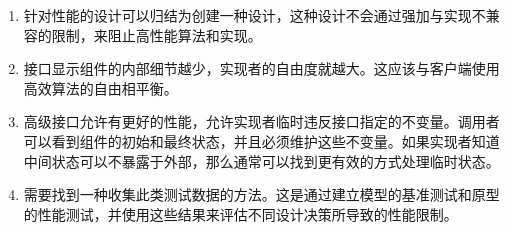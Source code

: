 \begin{enumerate}
\item 
针对性能的设计可以归结为创建一种设计，这种设计不会通过强加与实现不兼容的限制，来阻止高性能算法和实现。

\item 
接口显示组件的内部细节越少，实现者的自由度就越大。这应该与客户端使用高效算法的自由相平衡。

\item 
高级接口允许有更好的性能，允许实现者临时违反接口指定的不变量。调用者可以看到组件的初始和最终状态，并且必须维护这些不变量。如果实现者知道中间状态可以不暴露于外部，那么通常可以找到更有效的方式处理临时状态。

\item
需要找到一种收集此类测试数据的方法。这是通过建立模型的基准测试和原型的性能测试，并使用这些结果来评估不同设计决策所导致的性能限制。

\end{enumerate}